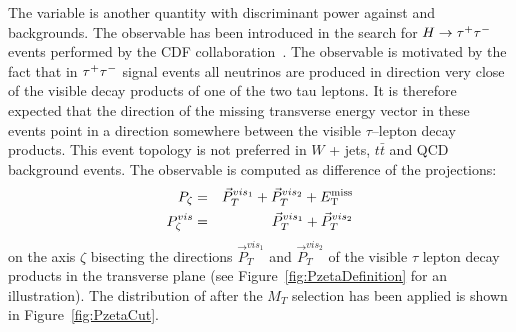 The \Pzeta variable is another quantity with discriminant power against \WpJets
and \ttbar backgrounds.  The observable has been introduced in the search for
$H\to\tau^+\tau^-$ events performed by the CDF collaboration~\cite{CDFrefPzeta}.  The
observable is motivated by the fact that in $\tau^+\tau^-$ signal events all neutrinos
are produced in direction very close of the visible decay products of one of the
two tau leptons. It is therefore expected that the direction of the missing
transverse energy vector in these events point in a direction somewhere between
the visible $\tau$--lepton decay products. This event topology is not preferred
in $W$ + jets, $t\bar{t}$ and QCD background events.  The observable is computed
as difference of the projections:
\begin{eqnarray}
P_{\zeta} &=& \vec{P}_{T}^{vis_{1}} + \vec{P}_{T}^{vis_{2}} + E_{\mathrm{T}}^{\text{miss}} \nonumber \\
P_{\zeta}^{vis} &=& \vec{P}_{T}^{vis_{1}} + \vec{P}_{T}^{vis_{2}} \nonumber
\label{eq:PZetaEq}
\end{eqnarray}
on the axis $\zeta$ bisecting the directions $\vec{P}_{T}^{vis_{1}}$ and
$\vec{P}_{T}^{vis_{2}}$ of the visible $\tau$ lepton decay products in the
transverse plane (see Figure~\ref{fig:PzetaDefinition} for an illustration).
The distribution of \Pzeta after the $M_T$ selection has been applied is shown
in Figure~\ref{fig:PzetaCut}.
